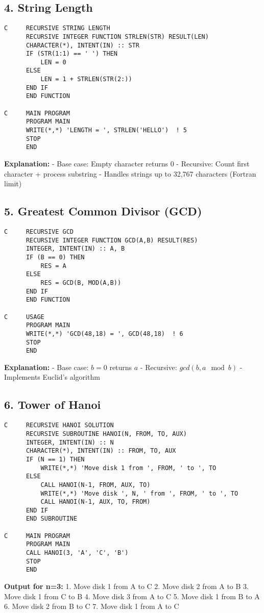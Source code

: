 \documentclass{book}
\begin{document}
\subsection*{4. String Length}
\begin{verbatim}
C     RECURSIVE STRING LENGTH
      RECURSIVE INTEGER FUNCTION STRLEN(STR) RESULT(LEN)
      CHARACTER(*), INTENT(IN) :: STR
      IF (STR(1:1) == ' ') THEN
          LEN = 0
      ELSE
          LEN = 1 + STRLEN(STR(2:))
      END IF
      END FUNCTION

C     MAIN PROGRAM
      PROGRAM MAIN
      WRITE(*,*) 'LENGTH = ', STRLEN('HELLO')  ! 5
      STOP
      END
\end{verbatim}
\textbf{Explanation:}  
- Base case: Empty character returns 0  
- Recursive: Count first character + process substring  
- Handles strings up to 32,767 characters (Fortran limit)  

\subsection*{5. Greatest Common Divisor (GCD)}
\begin{verbatim}
C     RECURSIVE GCD
      RECURSIVE INTEGER FUNCTION GCD(A,B) RESULT(RES)
      INTEGER, INTENT(IN) :: A, B
      IF (B == 0) THEN
          RES = A
      ELSE
          RES = GCD(B, MOD(A,B))
      END IF
      END FUNCTION

C     USAGE
      PROGRAM MAIN
      WRITE(*,*) 'GCD(48,18) = ', GCD(48,18)  ! 6
      STOP
      END
\end{verbatim}
\textbf{Explanation:}  
- Base case: \( b = 0 \) returns \( a \)  
- Recursive: \( gcd(b, a \mod b) \)  
- Implements Euclid's algorithm  

\subsection*{6. Tower of Hanoi}
\begin{verbatim}
C     RECURSIVE HANOI SOLUTION
      RECURSIVE SUBROUTINE HANOI(N, FROM, TO, AUX)
      INTEGER, INTENT(IN) :: N
      CHARACTER(*), INTENT(IN) :: FROM, TO, AUX
      IF (N == 1) THEN
          WRITE(*,*) 'Move disk 1 from ', FROM, ' to ', TO
      ELSE
          CALL HANOI(N-1, FROM, AUX, TO)
          WRITE(*,*) 'Move disk ', N, ' from ', FROM, ' to ', TO
          CALL HANOI(N-1, AUX, TO, FROM)
      END IF
      END SUBROUTINE

C     MAIN PROGRAM
      PROGRAM MAIN
      CALL HANOI(3, 'A', 'C', 'B')
      STOP
      END
\end{verbatim}
\textbf{Output for n=3:}  
1. Move disk 1 from A to C  
2. Move disk 2 from A to B  
3. Move disk 1 from C to B  
4. Move disk 3 from A to C  
5. Move disk 1 from B to A  
6. Move disk 2 from B to C  
7. Move disk 1 from A to C  
\end{document}
